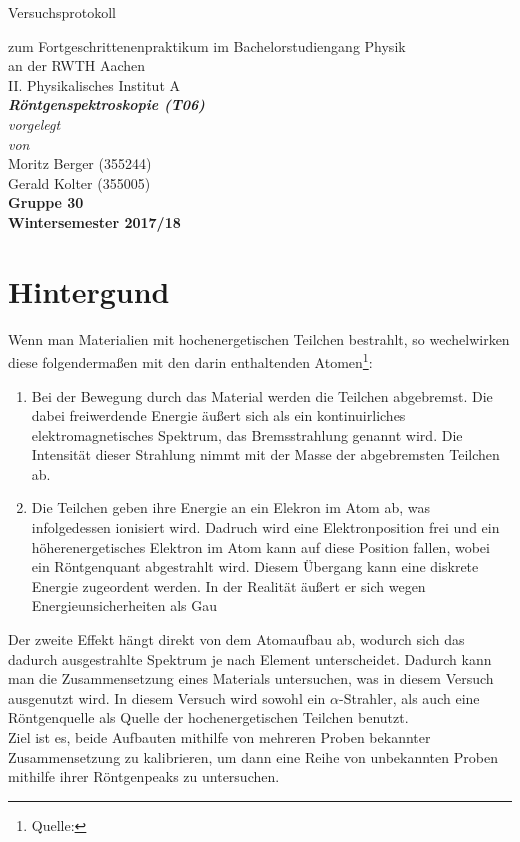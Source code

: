 \documentclass[12pt,a4paper]{article}
\author{Gerald}
\begin{document}
	\setlength{\parindent}{0pt} 
	\begin{center}
		{\LARGE Versuchsprotokoll}\\
		\begin{large}
			zum Fortgeschrittenenpraktikum im Bachelorstudiengang Physik\\[0.4cm]
			an der RWTH Aachen\\
			II. Physikalisches Institut A\\[5.5cm]
			\Large\textbf{\textsl{Röntgenspektroskopie (T06)}}\\[5.5cm]
			\normalsize\textit{vorgelegt\\von}\\[0.4cm]
			\large{Moritz Berger (355244)\\Gerald Kolter (355005)}\\\textbf{Gruppe 30}\\[2cm]
			\large \textbf{Wintersemester 2017/18}
		\end{large}
	\end{center}
	\newpage
	
	\tableofcontents
	\newpage
	
\section{Hintergund}
Wenn man Materialien mit hochenergetischen Teilchen bestrahlt, so wechelwirken diese folgendermaßen mit den darin enthaltenden Atomen\footnote{Quelle:}:
\begin{enumerate}
\item Bei der Bewegung durch das Material werden die Teilchen abgebremst. Die dabei freiwerdende Energie äußert sich als ein kontinuirliches elektromagnetisches Spektrum, das Bremsstrahlung genannt wird. Die Intensität dieser Strahlung nimmt mit der Masse der abgebremsten Teilchen ab.
\item Die Teilchen geben ihre Energie an ein Elekron im Atom ab, was infolgedessen ionisiert wird. Dadruch wird eine Elektronposition frei und ein höherenergetisches Elektron im Atom kann auf diese Position fallen, wobei ein Röntgenquant abgestrahlt wird. Diesem Übergang kann eine diskrete Energie zugeordent werden. In der Realität äußert er sich wegen Energieunsicherheiten als Gau
\end{enumerate}
Der zweite Effekt hängt direkt von dem Atomaufbau ab, wodurch sich das dadurch ausgestrahlte Spektrum je nach Element unterscheidet. Dadurch kann man die Zusammensetzung eines Materials untersuchen, was in diesem Versuch ausgenutzt wird.
In diesem Versuch wird sowohl ein $\alpha$-Strahler, als auch eine Röntgenquelle als Quelle der hochenergetischen Teilchen benutzt.\\
Ziel ist es, beide Aufbauten mithilfe von mehreren Proben bekannter Zusammensetzung zu kalibrieren, um dann eine Reihe von unbekannten Proben mithilfe ihrer Röntgenpeaks zu untersuchen.
\end{document}
